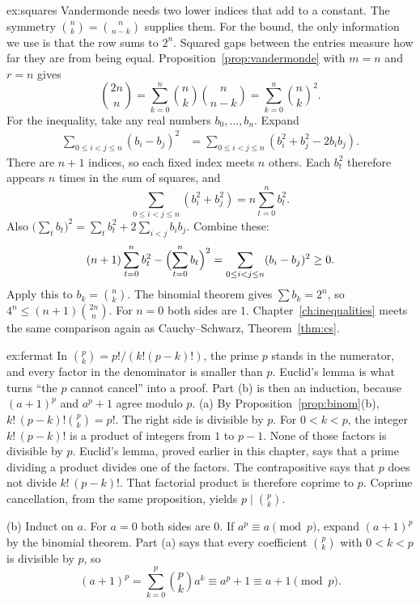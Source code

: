 \begin{solution}{ex:squares}
\idea Vandermonde needs two lower indices that add to a constant. The symmetry $\binom nk=\binom n{n-k}$ supplies them. For the bound, the only information we use is that the row sums to $2^n$. Squared gaps between the entries measure how far they are from being equal.
\writeup Proposition~\ref{prop:vandermonde} with $m=n$ and $r=n$ gives
\[
\binom{2n}{n}=\sum_{k=0}^n\binom nk\binom n{n-k}=\sum_{k=0}^n\binom nk^2.
\]
For the inequality, take any real numbers $b_0,\dots,b_n$. Expand
\begin{align*}
\sum_{0\le i<j\le n}(b_i-b_j)^2
&=\sum_{0\le i<j\le n}(b_i^2+b_j^2-2b_ib_j).
\end{align*}
There are $n+1$ indices, so each fixed index meets $n$ others. Each $b_t^2$ therefore appears $n$ times in the sum of squares, and
\[
\sum_{0\le i<j\le n}(b_i^2+b_j^2)=n\sum_{t=0}^n b_t^2.
\]
Also $\bigl(\sum_t b_t\bigr)^2=\sum_t b_t^2+2\sum_{i<j}b_ib_j$. Combine these:
\[
(n+1)\sum_{t=0}^n b_t^2-\Bigl(\sum_{t=0}^n b_t\Bigr)^2=\sum_{0\le i<j\le n}(b_i-b_j)^2\ge0.
\]
Apply this to $b_k=\binom nk$. The binomial theorem gives $\sum b_k=2^n$, so $4^n\le(n+1)\binom{2n}{n}$. For $n=0$ both sides are $1$. Chapter~\ref{ch:inequalities} meets the same comparison again as Cauchy--Schwarz, Theorem~\ref{thm:cs}.
\end{solution}

\begin{solution}{ex:fermat}
\idea In $\binom pk=p!/(k!(p-k)!)$, the prime $p$ stands in the numerator, and every factor in the denominator is smaller than $p$. Euclid's lemma is what turns ``the $p$ cannot cancel'' into a proof. Part (b) is then an induction, because $(a+1)^p$ and $a^p+1$ agree modulo $p$.
\writeup (a) By Proposition~\ref{prop:binom}(b), $k!\,(p-k)!\binom pk=p!$. The right side is divisible by $p$. For $0<k<p$, the integer $k!\,(p-k)!$ is a product of integers from $1$ to $p-1$. None of those factors is divisible by $p$. Euclid's lemma, proved earlier in this chapter, says that a prime dividing a product divides one of the factors. The contrapositive says that $p$ does not divide $k!\,(p-k)!$. That factorial product is therefore coprime to $p$. Coprime cancellation, from the same proposition, yields $p\mid\binom pk$.

(b) Induct on $a$. For $a=0$ both sides are $0$. If $a^p\equiv a\pmod p$, expand $(a+1)^p$ by the binomial theorem. Part (a) says that every coefficient $\binom pk$ with $0<k<p$ is divisible by $p$, so
\[
(a+1)^p=\sum_{k=0}^p\binom pk a^k\equiv a^p+1\equiv a+1\pmod p.
\]
\end{solution}

